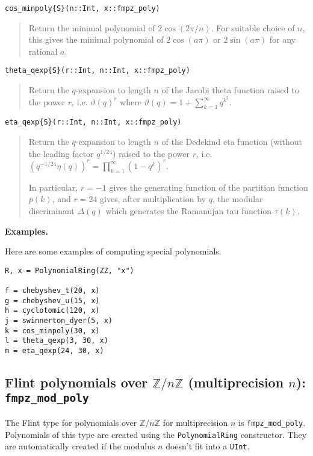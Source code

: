 \documentclass[a4paper,10pt]{article}
\newcommand{\Z}{\mathbb{Z}}
\newcommand{\code}{\lstinline}
\newcommand{\desc}[1]{\vspace{-3mm}\begin{quote}#1\end{quote}}
\begin{document}
{{\begin{lstlisting}
cos_minpoly{S}(n::Int, x::fmpz_poly)
\end{lstlisting}

\desc{Return the minimal polynomial of $2 \cos(2 \pi / n)$. For suitable choice of 
$n$, this gives the minimal polynomial of $2 \cos(a \pi)$ or $2 \sin(a \pi)$ for any
rational $a$.}

\begin{lstlisting}
theta_qexp{S}(r::Int, n::Int, x::fmpz_poly)
\end{lstlisting}

\desc{Return the $q$-expansion to length $n$ of the Jacobi theta function raised to 
the power $r$, i.e. $\vartheta(q)^r$ where 
$\vartheta(q) = 1 + \sum_{k=1}^{\infty} q^{k^2}$.}

\begin{lstlisting}
eta_qexp{S}(r::Int, n::Int, x::fmpz_poly)
\end{lstlisting}

\desc{Return the $q$-expansion to length $n$ of the Dedekind eta function (without 
the leading factor $q^{1/24}$) raised to the power $r$, i.e. $(q^{-1/24} \eta(q))^r 
= \prod_{k=1}^{\infty} (1 - q^k)^r$.

In particular, $r = -1$ gives the generating function of the partition function $p(k)$, 
and $r = 24$ gives, after multiplication by $q$, the modular discriminant $\Delta(q)$ 
which generates the Ramanujan tau function $\tau(k)$.}

\textbf{Examples.}

Here are some examples of computing special polynomials.

\begin{lstlisting}
R, x = PolynomialRing(ZZ, "x")

f = chebyshev_t(20, x)
g = chebyshev_u(15, x)
h = cyclotomic(120, x)
j = swinnerton_dyer(5, x)
k = cos_minpoly(30, x)
l = theta_qexp(3, 30, x)
m = eta_qexp(24, 30, x)
\end{lstlisting}

\subsection{Flint polynomials over $\Z/n\Z$ (multiprecision $n$): \code{fmpz_mod_poly}}

The Flint type for polynomials over $\Z/n\Z$ for multiprecision $n$ is \code{fmpz_mod_poly}.
Polynomials of this type are created using the \code{PolynomialRing} constructor. They are
automatically created if the modulus $n$ doesn't fit into a \code{UInt}.

}}
\end{document}
